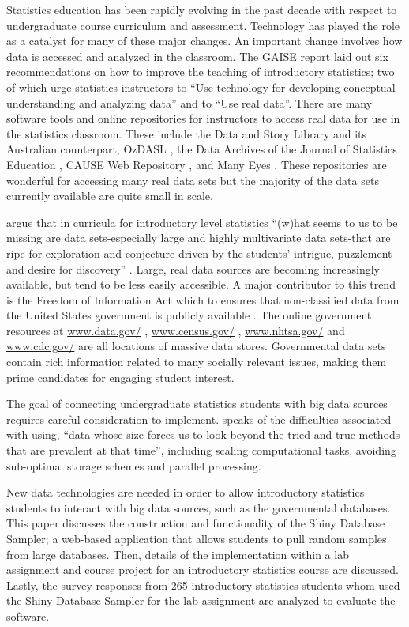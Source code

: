 \documentclass[11pt]{isuthesis}\usepackage[]{graphicx}\usepackage[]{color}
\begin{document}
Statistics education has been rapidly evolving in the past decade with respect to undergraduate course curriculum and assessment. Technology has played the role as a catalyst for many of these major changes. An important change involves how data is accessed and analyzed in the classroom. The GAISE report \citep{GAISEcollege} laid out six recommendations on how to improve the teaching of introductory statistics; two of which urge statistics instructors to ``Use technology for developing conceptual understanding and analyzing data'' and to ``Use real data''. There are many software tools and online repositories for instructors to access real data for use in the statistics classroom. These include the Data and Story Library \citep{DASL} and its Australian counterpart, OzDASL \citep{OzDASL}, the Data Archives of the Journal of Statistics Education \citep{JSErepo}, CAUSE Web Repository \citep{CAUSErepo}, and Many Eyes \citep{ManyEyes}. These repositories are wonderful for accessing many real data sets but the majority of the data sets currently available are quite small in scale.

\citet{Finzer2007} argue that in curricula for introductory level statistics ``(w)hat seems to us to be missing are data sets-especially large and highly multivariate data sets-that are ripe for exploration and conjecture driven by the students' intrigue, puzzlement and desire for discovery'' \citep[p.1]{Finzer2007}. Large, real data sources are becoming increasingly available, but tend to be less easily accessible. A major contributor to this trend is the Freedom of Information Act which to ensures that non-classified data from the United States government is publicly available \citep{FOIA}. The online government resources at \url{www.data.gov/} \citep{DataGov}, \url{www.census.gov/} \citep{Census}, \url{www.nhtsa.gov/} \citep{NHTSA} and \url{www.cdc.gov/} \citep{CDC} are all locations of massive data stores. Governmental data sets contain rich information related to many socially relevant issues, making them prime candidates for engaging student interest.

The goal of connecting undergraduate statistics students with big data sources requires careful consideration to implement. \citet{jacobs2009} speaks of the difficulties associated with using, ``data whose size forces us to look beyond the tried-and-true methods that are prevalent at that time'', including scaling computational tasks, avoiding sub-optimal storage schemes and parallel processing.

New data technologies are needed in order to allow introductory statistics students to interact with big data sources, such as the governmental databases. This paper discusses the construction and functionality of the Shiny Database Sampler; a web-based application that allows students to pull random samples from large databases. Then, details of the implementation within a lab assignment and course project for an introductory statistics course are discussed. Lastly, the survey responses from 265 introductory statistics students whom used the Shiny Database Sampler for the lab assignment are analyzed to evaluate the software.
\end{document}

